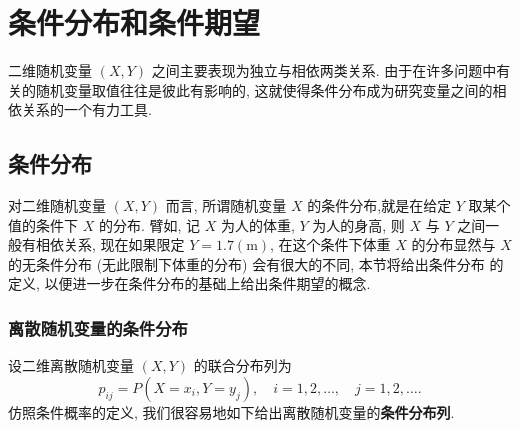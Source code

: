 	\section{条件分布和条件期望}\label{sec:3.5}

	二维随机变量 $(X,Y)$ 之间主要表现为独立与相依两类关系.
	由于在许多问题中有关的随机变量取值往往是彼此有影响的, 这就使得条件分布成为研究变量之间的相依关系的一个有力工具.

	\subsection{条件分布}\label{ssec:3.5.1}

	对二维随机变量 $(X,Y)$ 而言, 所谓随机变量 $X$ 的条件分布,就是在给定 $Y$ 取某个值的条件下 $X$ 的分布.
	臂如, 记 $X$ 为人的体重, $Y$ 为人的身高, 则 $X$ 与 $Y$ 之间一般有相依关系, 现在如果限定 $Y=1.7(\mathrm{m})$,
	在这个条件下体重 $X$ 的分布显然与 $X$ 的无条件分布 (无此限制下体重的分布) 会有很大的不同, 本节将给出条件分布
	的定义, 以便进一步在条件分布的基础上给出条件期望的概念.

	\subsubsection{离散随机变量的条件分布}

	设二维离散随机变量 $(X,Y)$ 的联合分布列为
	\[
		p_{ij} = P(X=x_i, Y= y_j),\quad i=1,2,\ldots,\quad j=1,2,\ldots.
	\]
	仿照条件概率的定义, 我们很容易地如下给出离散随机变量的\textbf{条件分布列}.

